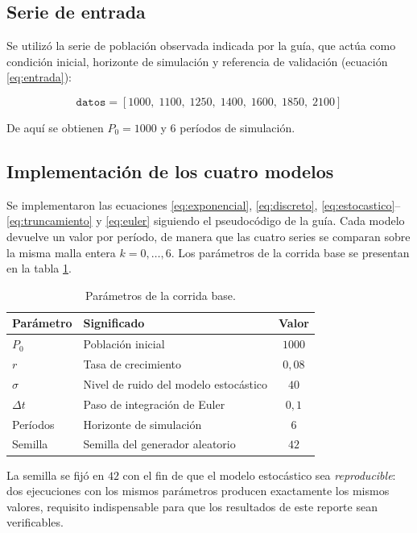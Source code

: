 \documentclass[11pt,a4paper]{article}
\begin{document}
\subsection{Serie de entrada}

Se utiliz\'o la serie de poblaci\'on observada indicada por la gu\'ia, que act\'ua como
condici\'on inicial, horizonte de simulaci\'on y referencia de validaci\'on
(ecuaci\'on \eqref{eq:entrada}):

\begin{equation}
\texttt{datos} = \left[1000,\;1100,\;1250,\;1400,\;1600,\;1850,\;2100\right]
\label{eq:entrada}
\end{equation}

De aqu\'i se obtienen $P_0 = 1000$ y $6$ per\'iodos de simulaci\'on.

\subsection{Implementaci\'on de los cuatro modelos}

Se implementaron las ecuaciones \eqref{eq:exponencial}, \eqref{eq:discreto},
\eqref{eq:estocastico}--\eqref{eq:truncamiento} y \eqref{eq:euler} siguiendo el
pseudoc\'odigo de la gu\'ia. Cada modelo devuelve un valor por per\'iodo, de manera que las
cuatro series se comparan sobre la misma malla entera $k = 0,\dots,6$. Los par\'ametros de
la corrida base se presentan en la tabla \ref{tab:parametros}.

\begin{table}[htbp]
\centering
\caption{Par\'ametros de la corrida base.}
\label{tab:parametros}
\small
\begin{tabular}{llc}
\toprule
\textbf{Par\'ametro} & \textbf{Significado} & \textbf{Valor} \\
\midrule
$P_0$    & Poblaci\'on inicial            & $1000$ \\
$r$      & Tasa de crecimiento            & $0{,}08$ \\
$\sigma$ & Nivel de ruido del modelo estoc\'astico & $40$ \\
$\Delta t$ & Paso de integraci\'on de Euler & $0{,}1$ \\
Per\'iodos & Horizonte de simulaci\'on    & $6$ \\
Semilla  & Semilla del generador aleatorio & $42$ \\
\bottomrule
\end{tabular}
\end{table}

La semilla se fij\'o en $42$ con el fin de que el modelo estoc\'astico sea
\emph{reproducible}: dos ejecuciones con los mismos par\'ametros producen exactamente los
mismos valores, requisito indispensable para que los resultados de este reporte sean
verificables.
\end{document}
